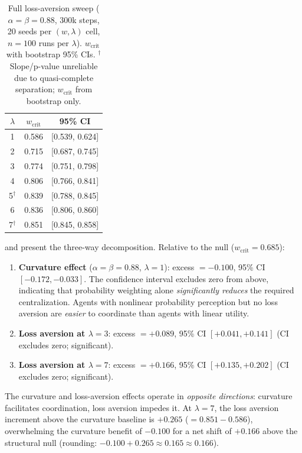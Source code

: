 \documentclass[11pt]{article}
\newcommand{\wcrit}{w_{\mathrm{crit}}}
\begin{document}
\begin{table}[tbp]
\centering
\caption{Full loss-aversion sweep ($\alpha{=}\beta{=}0.88$, 300k steps,
20 seeds per $(w,\lambda)$ cell, $n{=}100$ runs per $\lambda$).
$\wcrit$ with bootstrap 95\% CIs. $^{\dagger}$Slope/p-value unreliable due to
quasi-complete separation; $\wcrit$ from bootstrap only.}
\label{tab:lambda_sweep}
\small
\begin{tabular}{ccc}
\toprule
$\lambda$ & $\wcrit$ & 95\% CI \\
\midrule
1 & 0.586 & [0.539, 0.624] \\
2 & 0.715 & [0.687, 0.745] \\
3 & 0.774 & [0.751, 0.798] \\
4 & 0.806 & [0.766, 0.841] \\
5$^{\dagger}$ & 0.839 & [0.788, 0.845] \\
6 & 0.836 & [0.806, 0.860] \\
7$^{\dagger}$ & 0.851 & [0.845, 0.858] \\
\bottomrule
\end{tabular}
\end{table}

 and  present the
three-way decomposition.
Relative to the null ($\wcrit = 0.685$):

\begin{enumerate}
  \item \textbf{Curvature effect} ($\alpha{=}\beta{=}0.88$, $\lambda{=}1$):
        excess $= -0.100$, 95\% CI $[-0.172, -0.033]$.
        The confidence interval excludes zero from above, indicating that
        probability weighting alone \emph{significantly reduces} the
        required centralization.
        Agents with nonlinear probability perception but no loss aversion
        are \emph{easier} to coordinate than agents with linear utility.

  \item \textbf{Loss aversion at $\lambda{=}3$}:
        excess $= +0.089$, 95\% CI $[+0.041, +0.141]$
        (CI excludes zero; significant).

  \item \textbf{Loss aversion at $\lambda{=}7$}:
        excess $= +0.166$, 95\% CI $[+0.135, +0.202]$
        (CI excludes zero; significant).
\end{enumerate}

The curvature and loss-aversion effects operate in \emph{opposite
directions}: curvature facilitates coordination, loss aversion impedes it.
At $\lambda{=}7$, the loss aversion increment above the curvature baseline
is $+0.265$ ($= 0.851 - 0.586$), overwhelming the curvature benefit
of $-0.100$ for a net shift of $+0.166$ above the structural null
(rounding: $-0.100 + 0.265 \approx 0.165 \approx 0.166$).
\end{document}
